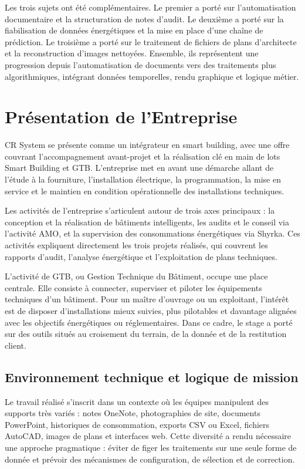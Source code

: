 \documentclass[12pt]{article}
\begin{document}
Les trois sujets ont été complémentaires. Le premier a porté sur l’automa\-tisation documentaire et la structuration de notes d’audit. Le deuxième a porté sur la fiabilisation de données énergétiques et la mise en place d’une chaîne de prédiction. Le troisième a porté sur le traitement de fichiers de plans d’architecte et la reconstruction d’images nettoyées. Ensemble, ils représentent une progression depuis l’automatisation de documents vers des traitements plus algorithmiques, intégrant données temporelles, rendu graphique et logique métier. 

\newpage
\tableofcontents
\newpage
\listoffigures
\newpage

\section{Présentation de l'Entreprise}

CR System se présente comme un intégrateur en smart building, avec une offre couvrant l’accompagnement avant-projet et la réalisation clé en main de lots Smart Building et GTB. L’entreprise met en avant une démarche allant de l’étude à la fourniture, l’installation électrique, la programmation, la mise en service et le maintien en condition opérationnelle des installations techniques. 

Les activités de l’entreprise s’articulent autour de trois axes principaux : la conception et la réalisation de bâtiments intelligents, les audits et le conseil via l’activité AMO, et la supervision des consommations énergétiques via Shyrka. Ces activités expliquent directement les trois projets réalisés, qui couvrent les rapports d’audit, l’analyse énergétique et l’exploitation de plans techniques. 

L’activité de GTB, ou Gestion Technique du Bâtiment, occupe une place centrale. Elle consiste à connecter, superviser et piloter les équipements techniques d’un bâtiment. Pour un maître d’ouvrage ou un exploitant, l’intérêt est de disposer d’installations mieux suivies, plus pilotables et davantage alignées avec les objectifs énergétiques ou réglementaires. Dans ce cadre, le stage a porté sur des outils situés au croisement du terrain, de la donnée et de la restitution client. 

\subsection{Environnement technique et logique de mission}

Le travail réalisé s’inscrit dans un contexte où les équipes manipulent des supports très variés : notes OneNote, photographies de site, documents PowerPoint, historiques de consommation, exports CSV ou Excel, fichiers AutoCAD, images de plans et interfaces web. Cette diversité a rendu nécessaire une approche pragmatique : éviter de figer les traitements sur une seule forme de donnée et prévoir des mécanismes de configuration, de sélection et de correction. 
\end{document}
